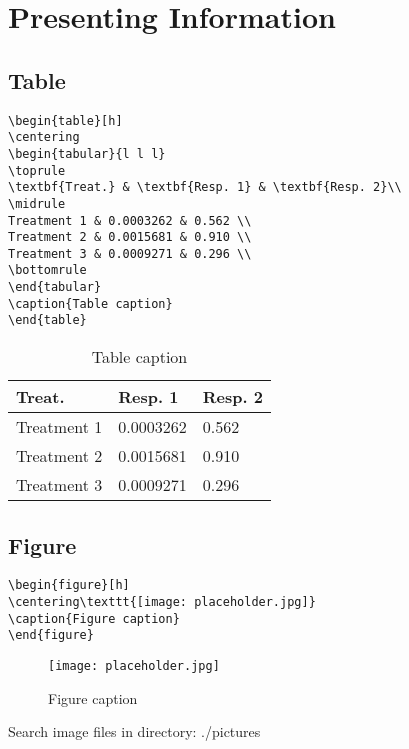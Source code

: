 \chapter{Presenting Information}

\lipsum[1] 
\section{Table}
\lipsum[1] 

\begin{notebox}
\begin{verbatim}
\begin{table}[h]
\centering
\begin{tabular}{l l l}
\toprule
\textbf{Treat.} & \textbf{Resp. 1} & \textbf{Resp. 2}\\
\midrule
Treatment 1 & 0.0003262 & 0.562 \\
Treatment 2 & 0.0015681 & 0.910 \\
Treatment 3 & 0.0009271 & 0.296 \\
\bottomrule
\end{tabular}
\caption{Table caption}
\end{table}
\end{verbatim}
\end{notebox}
\begin{table}[h]
\centering
\begin{tabular}{l l l}
\toprule
\textbf{Treat.} & \textbf{Resp. 1} & \textbf{Resp. 2}\\
\midrule
Treatment 1 & 0.0003262 & 0.562 \\
Treatment 2 & 0.0015681 & 0.910 \\
Treatment 3 & 0.0009271 & 0.296 \\
\bottomrule
\end{tabular}
\caption{Table caption}
\end{table}

\section{Figure}

\lipsum[1] 

\begin{notebox}
\begin{verbatim}
\begin{figure}[h]
\centering\texttt{[image: placeholder.jpg]}
\caption{Figure caption}
\end{figure}
\end{verbatim}
\end{notebox}
\begin{figure}[h]
\centering\texttt{[image: placeholder.jpg]}
\caption{Figure caption}
\end{figure}

\begin{attentionbox}
Search image files in directory: ./pictures\\
\end{attentionbox}

